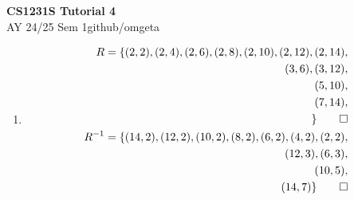 \documentclass[12pt, a4paper]{article}
\newcommand{\mytitle}{CS1231S Tutorial 4}
\newcommand{\myauthor}{github/omgeta}
\newcommand{\mydate}{AY 24/25 Sem 1}
\begin{document}
\raggedright
\footnotesize
\begin{center}
{\normalsize{\textbf{\mytitle}}} \\
{\footnotesize{\mydate\hspace{2pt}\textemdash\hspace{2pt}\myauthor}}
\end{center}
\begin{enumerate}[Q\arabic*.]
  \item
    \begin{align*}
      R = \{
        (2,2), (2,4), (2,6), (2,8), (2, 10), (2, 12), (2, 14),\\
        (3,6), (3, 12),\\
        (5, 10),\\
        (7, 14),\\
      \}\qed\\
      R^{-1} = \{
        (14,2), (12,2), (10,2), (8,2), (6,2), (4,2), (2, 2),\\
        (12,3), (6,3),\\
        (10,5),\\
      (14,7)\} \qed\\
    \end{align*}



\end{enumerate}
\end{document}
